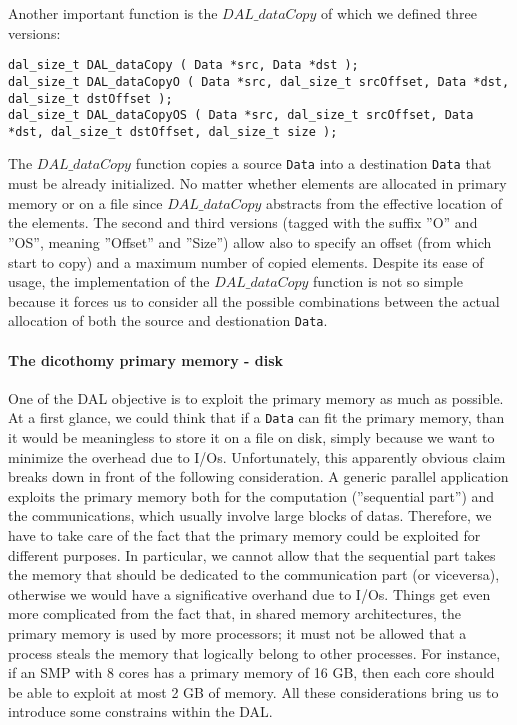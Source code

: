 Another important function is the $DAL\_dataCopy$ of which we defined three versions:
\begin{lstlisting}
dal_size_t DAL_dataCopy ( Data *src, Data *dst ); 
dal_size_t DAL_dataCopyO ( Data *src, dal_size_t srcOffset, Data *dst, dal_size_t dstOffset ); 
dal_size_t DAL_dataCopyOS ( Data *src, dal_size_t srcOffset, Data *dst, dal_size_t dstOffset, dal_size_t size );
\end{lstlisting}
The $DAL\_dataCopy$ function copies a source \texttt{Data} into a destination \texttt{Data} that must be already initialized. No matter whether elements are allocated in primary memory or on a file since $DAL\_dataCopy$ abstracts from the effective location of the elements. The second and third versions (tagged with the suffix ''O'' and ''OS'', meaning ''Offset'' and ''Size'') allow also to specify an offset (from which start to copy) and a maximum number of copied elements. Despite its ease of usage, the implementation of  the $DAL\_dataCopy$ function is not so simple because it forces us to consider all the possible combinations between the actual allocation of both the source and destionation \texttt{Data}. 

\paragraph{The dicothomy primary memory - disk}
One of the DAL objective is to exploit the primary memory as much as possible. At a first glance, we could think that if a \texttt{Data} can fit the primary memory, than it would be meaningless to store it on a file on disk, simply because we want to minimize the overhead due to I/Os. Unfortunately, this apparently obvious claim breaks down in front of the following consideration. A generic parallel application exploits the primary memory both for the computation (''sequential part'') and the communications, which usually involve large blocks of datas. Therefore, we have to take care of the fact that the primary memory could be exploited for different purposes. In particular, we cannot allow that the sequential part takes the memory that should be dedicated to the communication part (or viceversa), otherwise we would have a significative overhand due to I/Os. Things get even more complicated from the fact that, in shared memory architectures, the primary memory is used by more processors; it must not be allowed that a process steals the memory that logically belong to other processes. For instance, if an SMP with 8 cores has a primary memory of 16 GB, then each core should be able to exploit at most 2 GB of memory. All these considerations bring us to introduce some constrains within the DAL. 

